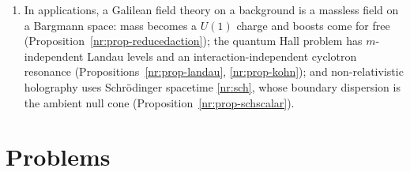 \begin{enumerate}
spacelike extra direction gives relativistic mechanics, and in both cases the action is
$-m$ times the displacement along the extra coordinate
(Table~\ref{tab:nr-rumer}, Section~\ref{sec:nr-rumer}).
\item In applications, a Galilean field theory on a background is a massless field
on a Bargmann space: mass becomes a $U(1)$ charge and boosts come for free
(Proposition~\ref{nr:prop-reducedaction}); the quantum Hall problem has $m$-independent
Landau levels and an interaction-independent cyclotron resonance
(Propositions~\ref{nr:prop-landau}, \ref{nr:prop-kohn}); and non-relativistic holography
uses Schr\"odinger spacetime \eqref{nr:sch}, whose boundary dispersion is the ambient null
cone (Proposition~\ref{nr:prop-schscalar}).
\end{enumerate}

\section{Problems}

